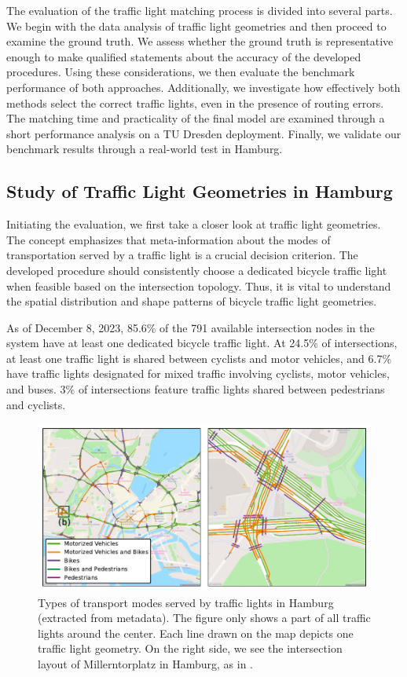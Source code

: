 The evaluation of the traffic light matching process is divided into several parts. We begin with the data analysis of traffic light geometries and then proceed to examine the ground truth. We assess whether the ground truth is representative enough to make qualified statements about the accuracy of the developed procedures. Using these considerations, we then evaluate the benchmark performance of both approaches. Additionally, we investigate how effectively both methods select the correct traffic lights, even in the presence of routing errors. The matching time and practicality of the final model are examined through a short performance analysis on a TU Dresden deployment. Finally, we validate our benchmark results through a real-world test in Hamburg.

\subsection{Study of Traffic Light Geometries in Hamburg}

Initiating the evaluation, we first take a closer look at traffic light geometries. The concept emphasizes that meta-information about the modes of transportation served by a traffic light is a crucial decision criterion. The developed procedure should consistently choose a dedicated bicycle traffic light when feasible based on the intersection topology. Thus, it is vital to understand the spatial distribution and shape patterns of bicycle traffic light geometries.

As of December 8, 2023, 85.6\% of the 791 available intersection nodes in the system have at least one dedicated bicycle traffic light. At 24.5\% of intersections, at least one traffic light is shared between cyclists and motor vehicles, and 6.7\% have traffic lights designated for mixed traffic involving cyclists, motor vehicles, and buses. 3\% of intersections feature traffic lights shared between pedestrians and cyclists.

\begin{figure}[!b]
\centering
\includegraphics[width=\linewidth]{images/lanes-map.pdf}
\caption{Types of transport modes served by traffic lights in Hamburg (extracted from metadata). The figure only shows a part of all traffic lights around the center. Each line drawn on the map depicts one traffic light geometry. On the right side, we see the intersection layout of Millerntorplatz in Hamburg, as in .}
\label{fig:lanes-map}
\end{figure}

